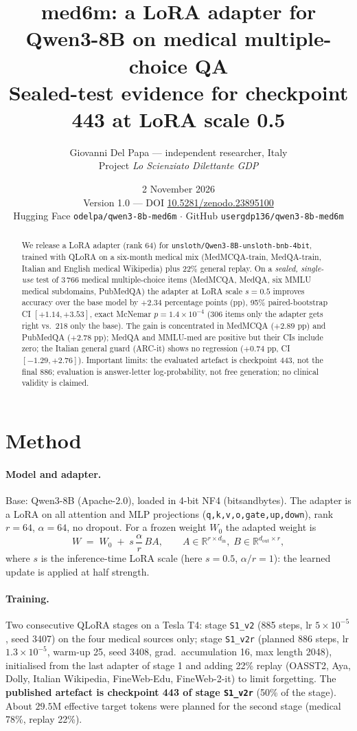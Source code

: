 \documentclass[11pt,a4paper]{article}
\title{\textbf{med6m: a LoRA adapter for Qwen3-8B on medical multiple-choice QA}\\[2pt]\large Sealed-test evidence for checkpoint 443 at LoRA scale 0.5}
\author{Giovanni Del Papa --- independent researcher, Italy\\ \small Project \emph{Lo Scienziato Dilettante GDP}}
\date{2 November 2026\\ \small Version 1.0 --- DOI \href{https://doi.org/10.5281/zenodo.23895100}{10.5281/zenodo.23895100}\\ \small Hugging Face \texttt{odelpa/qwen3-8b-med6m} $\cdot$ GitHub \texttt{usergdp136/qwen3-8b-med6m}}
\begin{document}
\maketitle
\begin{abstract}
We release a LoRA adapter (rank 64) for \texttt{unsloth/Qwen3-8B-unsloth-bnb-4bit}, trained with QLoRA on a six-month medical mix (MedMCQA-train, MedQA-train, Italian and English medical Wikipedia) plus 22\% general replay. On a \emph{sealed, single-use} test of 3\,766 medical multiple-choice items (MedMCQA, MedQA, six MMLU medical subdomains, PubMedQA) the adapter at LoRA scale $s=0.5$ improves accuracy over the base model by $+2.34$ percentage points (pp), 95\% paired-bootstrap CI $[+1.14,+3.53]$, exact McNemar $p=1.4\times10^{-4}$ (306 items only the adapter gets right vs.\ 218 only the base). The gain is concentrated in MedMCQA ($+2.89$ pp) and PubMedQA ($+2.78$ pp); MedQA and MMLU-med are positive but their CIs include zero; the Italian general guard (ARC-it) shows no regression ($+0.74$ pp, CI $[-1.29,+2.76]$). Important limits: the evaluated artefact is checkpoint 443, not the final 886; evaluation is answer-letter log-probability, not free generation; no clinical validity is claimed.
\end{abstract}

\section{Method}
\paragraph{Model and adapter.} Base: Qwen3-8B (Apache-2.0), loaded in 4-bit NF4 (bitsandbytes). The adapter is a LoRA on all attention and MLP projections (\texttt{q,k,v,o,gate,up,down}), rank $r=64$, $\alpha=64$, no dropout. For a frozen weight $W_0$ the adapted weight is
\begin{equation}\label{eq:lora}
W \;=\; W_0 \;+\; s\,\frac{\alpha}{r}\,B A,\qquad A\in\mathbb{R}^{r\times d_{\mathrm{in}}},\; B\in\mathbb{R}^{d_{\mathrm{out}}\times r},
\end{equation}
where $s$ is the inference-time LoRA scale (here $s=0.5$, $\alpha/r=1$): the learned update is applied at half strength.

\paragraph{Training.} Two consecutive QLoRA stages on a Tesla T4: stage \texttt{S1\_v2} (885 steps, lr $5\times10^{-5}$, seed 3407) on the four medical sources only; stage \texttt{S1\_v2r} (planned 886 steps, lr $1.3\times10^{-5}$, warm-up 25, seed 3408, grad.\ accumulation 16, max length 2048), initialised from the last adapter of stage 1 and adding 22\% replay (OASST2, Aya, Dolly, Italian Wikipedia, FineWeb-Edu, FineWeb-2-it) to limit forgetting. The \textbf{published artefact is checkpoint 443 of stage \texttt{S1\_v2r}} (50\% of the stage). About $29.5$M effective target tokens were planned for the second stage (medical 78\%, replay 22\%).
\end{document}

